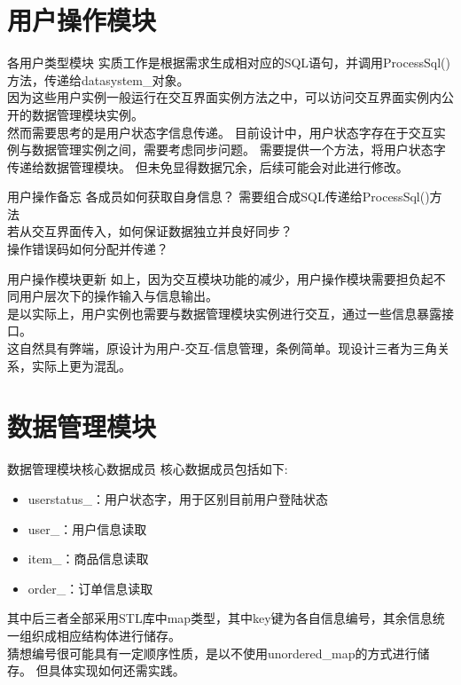 \documentclass[10pt]{beamer}
\begin{document}
\section{用户操作模块}

\begin{frame}{各用户类型模块}
    实质工作是根据需求生成相对应的SQL语句，并调用ProcessSql()方法，传递给datasystem\_对象。\\
    因为这些用户实例一般运行在交互界面实例方法之中，可以访问交互界面实例内公开的数据管理模块实例。\\
    然而需要思考的是用户状态字信息传递。
    目前设计中，用户状态字存在于交互实例与数据管理实例之间，需要考虑同步问题。
    需要提供一个方法，将用户状态字传递给数据管理模块。
    但未免显得数据冗余，后续可能会对此进行修改。\\
\end{frame}

\begin{frame}{用户操作备忘}
    各成员如何获取自身信息？
    需要组合成SQL传递给ProcessSql()方法\\
    若从交互界面传入，如何保证数据独立并良好同步？\\
    操作错误码如何分配并传递？\\
\end{frame}

\begin{frame}{用户操作模块更新}
    如上，因为交互模块功能的减少，用户操作模块需要担负起不同用户层次下的操作输入与信息输出。\\
    是以实际上，用户实例也需要与数据管理模块实例进行交互，通过一些信息暴露接口。\\
    这自然具有弊端，原设计为用户-交互-信息管理，条例简单。现设计三者为三角关系，实际上更为混乱。
\end{frame}

\section{数据管理模块}

\begin{frame}{数据管理模块核心数据成员}
    核心数据成员包括如下:\\
    \begin{itemize}
        \item userstatus\_：用户状态字，用于区别目前用户登陆状态
        \item user\_：用户信息读取
        \item item\_：商品信息读取
        \item order\_：订单信息读取
    \end{itemize}
    其中后三者全部采用STL库中map类型，其中key键为各自信息编号，其余信息统一组织成相应结构体进行储存。\\
    猜想编号很可能具有一定顺序性质，是以不使用unordered\_map的方式进行储存。
    但具体实现如何还需实践。\\
\end{frame}
\end{document}
